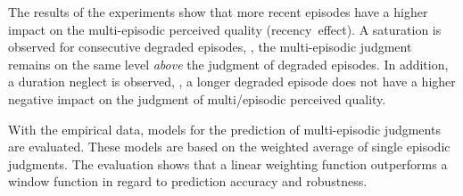 The results of the experiments show that more recent episodes have a higher impact on the multi-episodic perceived quality (recency~effect). 
A saturation is observed for consecutive degraded episodes, \ie, the multi-episodic judgment remains on the same level \emph{above} the judgment of degraded episodes.
In addition, a duration neglect is observed, \ie, a longer degraded episode does not have a higher negative impact on the judgment of multi\-/episodic perceived quality. 


With the empirical data, models for the prediction of multi-episodic judgments are evaluated.
These models are based on the weighted average of single episodic judgments.
The evaluation shows that a linear weighting function outperforms a window function in regard to prediction accuracy and robustness.


